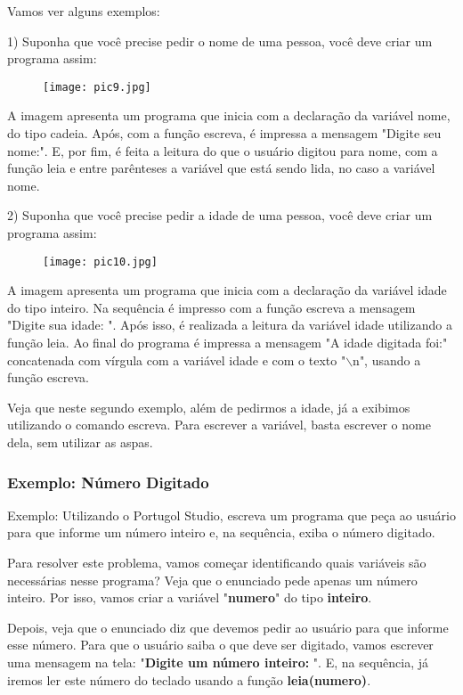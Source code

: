 \documentclass{article}
\begin{document}
Vamos ver alguns exemplos:

1) Suponha que você precise pedir o nome de uma pessoa, você deve criar um programa assim:
\begin{figure}[H]
    \centering
    \texttt{[image: pic9.jpg]}
    \label{fig:pic9}
\end{figure}

A imagem apresenta um programa que inicia com a declaração da variável nome, do tipo cadeia. Após, com a função escreva, é impressa a mensagem "Digite seu nome:". E, por fim, é feita a leitura do que o usuário digitou para nome, com a função leia e entre parênteses a variável que está sendo lida, no caso a variável nome.

2) Suponha que você precise pedir a idade de uma pessoa, você deve criar um programa assim:
\begin{figure}[H]
    \centering
    \texttt{[image: pic10.jpg]}
    \label{fig:pic10}
\end{figure}

A imagem apresenta um programa que inicia com a declaração da variável idade do tipo inteiro. Na sequência é impresso com a função escreva a mensagem "Digite sua idade: ". Após isso, é realizada a leitura da variável idade utilizando a função leia. Ao final do programa é impressa a mensagem "A idade digitada foi:" concatenada com vírgula com a variável idade e com o texto "$\backslash$n", usando a função escreva.

Veja que neste segundo exemplo, além de pedirmos a idade, já a exibimos utilizando o comando escreva. Para escrever a variável, basta escrever o nome dela, sem utilizar as aspas.

\subsubsection{Exemplo: Número Digitado}
Exemplo: Utilizando o Portugol Studio, escreva um programa que peça ao usuário para que informe um número inteiro e, na sequência, exiba o número digitado.

Para resolver este problema, vamos começar identificando quais variáveis são necessárias nesse programa? Veja que o enunciado pede apenas um número inteiro. Por isso, vamos criar a variável "\textbf{numero}" do tipo \textbf{inteiro}.

Depois, veja que o enunciado diz que devemos pedir ao usuário para que informe esse número. Para que o usuário saiba o que deve ser digitado, vamos escrever uma mensagem na tela: "\textbf{Digite um número inteiro:} ". E, na sequência, já iremos ler este número do teclado usando a função \textbf{leia(numero)}.
\end{document}
